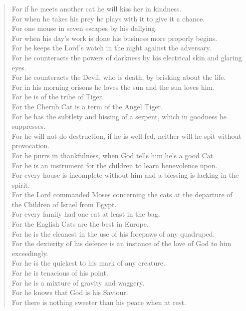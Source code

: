 \begin{verse}
  For if he meets another cat he will kiss her in kindness.\\
  For when he takes his prey he plays with it to give it a chance.\\
  For one mouse in seven escapes by his dallying.\\
  For when his day's work is done his business more properly begins.\\
  For he keeps the Lord's watch in the night against the adversary.\\
  For he counteracts the powers of darkness by his electrical skin and glaring eyes.\\
  For he counteracts the Devil, who is death, by brisking about the life.\\
  For in his morning orisons he loves the sun and the sun loves him.\\
  For he is of the tribe of Tiger.\\
  For the Cherub Cat is a term of the Angel Tiger.\\
  For he has the subtlety and hissing of a serpent, which in goodness he suppresses.\\
  For he will not do destruction, if he is well-fed, neither will he spit without provocation.\\
  For he purrs in thankfulness, when God tells him he's a good Cat.\\
  For he is an instrument for the children to learn benevolence upon.\\
  For every house is incomplete without him and a blessing is lacking in the spirit.\\
  For the Lord commanded Moses concerning the cats at the departure of the Children of Israel from Egypt.\\
  For every family had one cat at least in the bag.\\
  For the English Cats are the best in Europe.\\
  For he is the cleanest in the use of his forepaws of any quadruped.\\
  For the dexterity of his defence is an instance of the love of God to him exceedingly.\\
  For he is the quickest to his mark of any creature.\\
  For he is tenacious of his point.\\
  For he is a mixture of gravity and waggery.\\
  For he knows that God is his Saviour.\\
  For there is nothing sweeter than his peace when at rest.\\

\end{verse}
